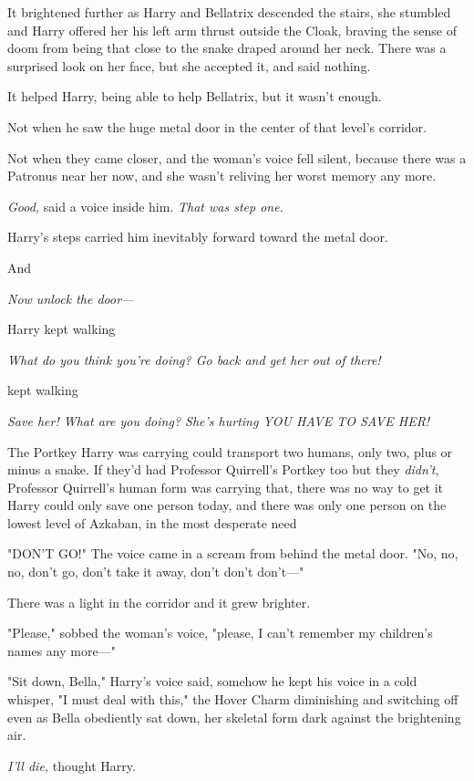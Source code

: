 It brightened further as Harry and Bellatrix descended the stairs, she stumbled
and Harry offered her his left arm thrust outside the Cloak, braving the sense
of doom from being that close to the snake draped around her neck. There was a
surprised look on her face, but she accepted it, and said nothing.

It helped Harry, being able to help Bellatrix, but it wasn't enough.

Not when he saw the huge metal door in the center of that level's corridor.

Not when they came closer, and the woman's voice fell silent, because there was
a Patronus near her now, and she wasn't reliving her worst memory any more.

\emph{Good,} said a voice inside him. \emph{That was step one.}

Harry's steps carried him inevitably forward toward the metal door.

And{\el}

\emph{Now unlock the door---}

{\el} Harry kept walking{\el}

\emph{What do you think you're doing? Go back and get her out of there!}

{\el} kept walking{\el}

\emph{Save her! What are you doing? She's hurting YOU HAVE TO SAVE HER!}

The Portkey Harry was carrying could transport two humans, only two, plus or
minus a snake. If they'd had Professor Quirrell's Portkey too{\el} but they
\emph{didn't}, Professor Quirrell's human form was carrying that, there was no
way to get it{\el} Harry could only save one person today, and there was
only one person on the lowest level of Azkaban, in the most desperate
need{\el}

"DON'T GO!" The voice came in a scream from behind the metal door. "No, no, no,
don't go, don't take it away, don't don't don't---"

There was a light in the corridor and it grew brighter.

"Please," sobbed the woman's voice, "please, I can't remember my children's
names any more---"

"Sit down, Bella," Harry's voice said, somehow he kept his voice in a cold
whisper, "I must deal with this," the Hover Charm diminishing and switching off
even as Bella obediently sat down, her skeletal form dark against the
brightening air.

\emph{I'll die,} thought Harry.

